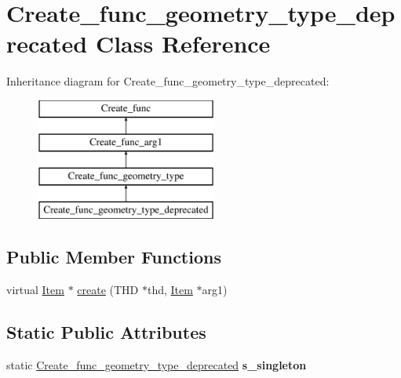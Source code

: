 \hypertarget{classCreate__func__geometry__type__deprecated}{}\section{Create\+\_\+func\+\_\+geometry\+\_\+type\+\_\+deprecated Class Reference}
\label{classCreate__func__geometry__type__deprecated}
Inheritance diagram for Create\+\_\+func\+\_\+geometry\+\_\+type\+\_\+deprecated\+:\begin{figure}[H]
\begin{center}
\leavevmode
\includegraphics[height=4.000000cm]{classCreate__func__geometry__type__deprecated}
\end{center}
\end{figure}
\subsection*{Public Member Functions}
\begin{DoxyCompactItemize}
\item 
virtual \mbox{\hyperlink{classItem}{Item}} $\ast$ \mbox{\hyperlink{classCreate__func__geometry__type__deprecated_a737de32ce101c672a4e5dcdccb3685fe}{create}} (T\+HD $\ast$thd, \mbox{\hyperlink{classItem}{Item}} $\ast$arg1)
\end{DoxyCompactItemize}
\subsection*{Static Public Attributes}
\begin{DoxyCompactItemize}
\item 
\mbox{\label{classCreate__func__geometry__type__deprecated_a8b6454c931d518ebe1831194dba6d3e5}} 
static \mbox{\hyperlink{classCreate__func__geometry__type__deprecated}{Create\+\_\+func\+\_\+geometry\+\_\+type\+\_\+deprecated}} {\bfseries s\+\_\+singleton}
\end{DoxyCompactItemize}
